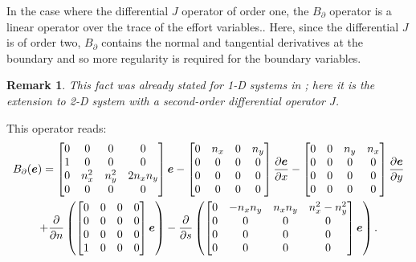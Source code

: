 \documentclass[11pt]{article}
\newtheorem{remark}{Remark}
\begin{document}
	In the case where the differential $J$ operator of order one, the $B_{\partial}$ operator is  a linear operator over the trace of the effort variables.. Here, since the differential $J$ is of order two,  $B_{\partial}$ contains the normal and tangential derivatives at the boundary and so more regularity is required for the boundary variables.
	\begin{remark}
		This fact was already stated for 1-D systems in \cite{LeGorrec2005}; here it is the extension to  2-D system with a second-order differential operator $J$.
	\end{remark}
	This operator reads:
	\begin{multline}
	B_{\partial}(\bm{e}) = 
	\begin{bmatrix}
	0 & 0 & 0 & 0 \\
	1 & 0 & 0 & 0 \\
	0 & n_x^2 & n_y^2 & 2 n_x n_y \\
	0 & 0 & 0 & 0 \\
	\end{bmatrix}\bm{e}  - 
	\begin{bmatrix}
	0 & n_x  & 0 & n_y  \\
	0 & 0 & 0 & 0 \\
	0 & 0 & 0 & 0 \\
	0 & 0 & 0 & 0 \\
	\end{bmatrix}\diffp{\bm{e}}{x} -
	\begin{bmatrix}
	0 & 0 & n_y & n_x  \\
	0 & 0 & 0 & 0 \\
	0 & 0 & 0 & 0 \\
	0 & 0 & 0 & 0 \\
	\end{bmatrix}\diffp{\bm{e}}{y} \\
	+ \diffp{}{n}\left(
	\begin{bmatrix}
	0 & 0 & 0 & 0 \\
	0 & 0 & 0 & 0 \\
	0 & 0 & 0 & 0 \\
	1 & 0 & 0 & 0 \\
	\end{bmatrix} \bm{e} \right) - \diffp{}{s}\left(
	\begin{bmatrix}
	0 & - n_x n_y & n_x n_y & n_x^2-n_y^2 \\
	0 & 0 & 0 & 0 \\
	0 & 0 & 0 & 0 \\
	0 & 0 & 0 & 0 \\
	\end{bmatrix} \bm{e} \right).
	\end{multline}
	
\end{document}
